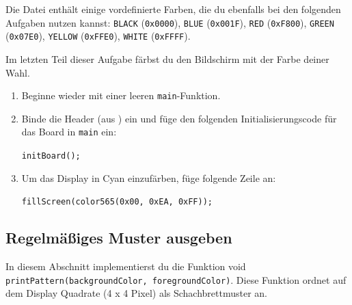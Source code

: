 Die Datei  enthält einige vordefinierte Farben, die du ebenfalls bei den folgenden Aufgaben nutzen kannst: 
\lstinline|BLACK| (\lstinline|0x0000|), \lstinline|BLUE| (\lstinline|0x001F|), \lstinline|RED| (\lstinline|0xF800|), 
\lstinline|GREEN| (\lstinline|0x07E0|), \lstinline|YELLOW| (\lstinline|0xFFE0|), \lstinline|WHITE| (\lstinline|0xFFFF|).

Im letzten Teil dieser Aufgabe färbst du den Bildschirm mit der Farbe deiner Wahl.
\begin{enumerate}
\item 
Beginne wieder mit einer leeren \lstinline|main|-Funktion.
\item 
Binde die Header  (aus ) ein und füge den folgenden Initialisierungscode für das Board in \lstinline|main| ein:

\lstinline|initBoard();|

\item 
Um das Display in Cyan einzufärben, füge folgende Zeile an:

\lstinline|fillScreen(color565(0x00, 0xEA, 0xFF));|
\end{enumerate}


\subsection{Regelmäßiges Muster ausgeben}
In diesem Abschnitt implementierst du die Funktion void \lstinline|printPattern(backgroundColor, foregroundColor)|.
Diese Funktion ordnet auf dem Display Quadrate (4 x 4 Pixel) als Schachbrettmuster an.




